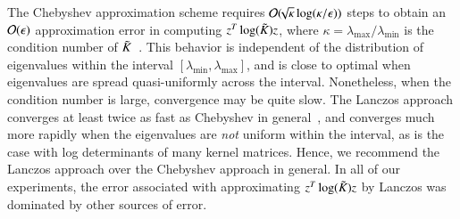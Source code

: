The Chebyshev approximation scheme requires $\mathcal{O}(\!\!\sqrt{\kappa}
\log(\kappa/\epsilon))$ steps to obtain an $\mathcal{O}(\epsilon)$ approximation error
in computing $z^T \log(\tilde{K}_{}) z$, where $\kappa = \lambda_{\max}/\lambda_
{\min}$ is the condition number of $\tilde{K}_{}$~\cite{han2015large}. This behavior
is independent of the distribution of eigenvalues within the interval $[\lambda_
{\min}, \lambda_{\max}]$, and is close to optimal when eigenvalues are spread
quasi-uniformly across the interval. Nonetheless, when the condition number is
large, convergence may be quite slow.  The Lanczos approach converges at least
twice as fast as Chebyshev in general~\cite[Remark 1]{ubarufast}, and converges
much more rapidly when the eigenvalues are {\em not} uniform within the
interval, as is the case with log determinants of many kernel matrices.  Hence,
we recommend the Lanczos approach over the Chebyshev approach in general.  In
all of our experiments, the error associated with approximating $z^T \log(\tilde{K}_{}) z$ by Lanczos was dominated by other sources of error.